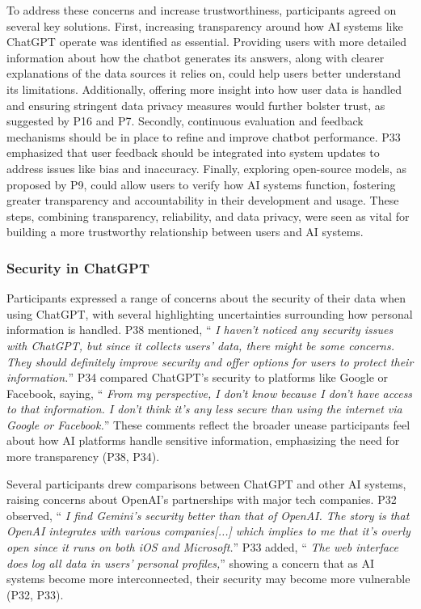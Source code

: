 \documentclass[sigconf]{acmart}
\begin{document}
To address these concerns and increase trustworthiness, participants agreed on several key solutions. First, increasing transparency around how AI systems like ChatGPT operate was identified as essential. Providing users with more detailed information about how the chatbot generates its answers, along with clearer explanations of the data sources it relies on, could help users better understand its limitations. Additionally, offering more insight into how user data is handled and ensuring stringent data privacy measures would further bolster trust, as suggested by P16 and P7. Secondly, continuous evaluation and feedback mechanisms should be in place to refine and improve chatbot performance. P33 emphasized that user feedback should be integrated into system updates to address issues like bias and inaccuracy. Finally, exploring open-source models, as proposed by P9, could allow users to verify how AI systems function, fostering greater transparency and accountability in their development and usage. These steps, combining transparency, reliability, and data privacy, were seen as vital for building a more trustworthy relationship between users and AI systems.


 


\subsubsection{Security in ChatGPT}
\hfill \break


Participants expressed a range of concerns about the security of their data when using ChatGPT, with several highlighting uncertainties surrounding how personal information is handled. P38 mentioned, \enquote { \emph {I haven’t noticed any security issues with ChatGPT, but since it collects users' data, there might be some concerns. They should definitely improve security and offer options for users to protect their information.}} P34 compared ChatGPT’s security to platforms like Google or Facebook, saying, \enquote { \emph {From my perspective, I don't know because I don't have access to that information. I don't think it's any less secure than using the internet via Google or Facebook.}} These comments reflect the broader unease participants feel about how AI platforms handle sensitive information, emphasizing the need for more transparency (P38, P34).

Several participants drew comparisons between ChatGPT and other AI systems, raising concerns about OpenAI’s partnerships with major tech companies. P32 observed, \enquote { \emph {I find Gemini's security better than that of OpenAI. The story is that OpenAI integrates with various companies[...] which implies to me that it’s overly open since it runs on both iOS and Microsoft.}} P33 added, \enquote { \emph { The web interface does log all data in users’ personal profiles,}} showing a concern that as AI systems become more interconnected, their security may become more vulnerable (P32, P33).
\end{document}
